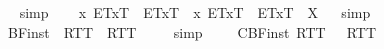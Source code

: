 \begin{isabellebody}
\isadelimproof
\ %
\endisadelimproof
%
\isatagproof
{}\isamarkupfalse%
\ simp\ \isamarkupfalse%
%
\endisatagproof
{\isafoldproof}%
%
\isadelimproof
%
\endisadelimproof
\isanewline
\ \isamarkupfalse%
\ {\isachardoublequoteopen}\isactrlbold {\isasymdiamond}{\isacharparenleft}\isactrlbold {\isasymexists}x{\isachardot}\ {\isasymlparr}E\isactrlsup T{\isacharcomma}x\isactrlsup T{\isasymrparr}\ \isactrlbold {\isasymand}\ \isactrlbold {\isasymdiamond}{\isacharparenleft}\isactrlbold {\isasymnot}{\isasymlparr}E\isactrlsup T{\isacharcomma}x\isactrlsup T{\isasymrparr}{\isacharparenright}{\isacharparenright}\ \isactrlbold {\isasymand}\ \isactrlbold {\isasymdiamond}{\isacharparenleft}\isactrlbold {\isasymnot}{\isacharparenleft}\isactrlbold {\isasymexists}x{\isachardot}\ {\isasymlparr}E\isactrlsup T{\isacharcomma}x\isactrlsup T{\isasymrparr}\ \isactrlbold {\isasymand}\ \isactrlbold {\isasymdiamond}{\isacharparenleft}\isactrlbold {\isasymnot}{\isasymlparr}E\isactrlsup T{\isacharcomma}x\isactrlsup T{\isasymrparr}{\isacharparenright}{\isacharparenright}{\isacharparenright}\ {\isacharequal}\ X{\isachardoublequoteclose}%
\isadelimproof
\ %
\endisadelimproof
%
\isatagproof
{}\isamarkupfalse%
\ simp\ \isamarkupfalse%
\ %
%
\endisatagproof
{\isafoldproof}%
%
\isadelimproof
%
\endisadelimproof
%
\isamarkuptrue%
\ \isamarkupfalse%
\ BF{\isacharunderscore}inst{\isacharcolon}\ {\isachardoublequoteopen}{\isacharbrackleft}{\isacharparenleft}\isactrlbold {\isasymforall}{\isasymalpha}{\isachardot}\ \isactrlbold {\isasymbox}{\isasymlparr}R\isactrlsup T{\isacharcomma}{\isasymalpha}\isactrlsup T{\isasymrparr}{\isacharparenright}\ \isactrlbold {\isasymrightarrow}\ \isactrlbold {\isasymbox}{\isacharparenleft}\isactrlbold {\isasymforall}{\isasymalpha}{\isachardot}{\isasymlparr}R\isactrlsup T{\isacharcomma}{\isasymalpha}\isactrlsup T{\isasymrparr}{\isacharparenright}{\isacharbrackright}\ {\isacharequal}\ {\isasymtop}{\isachardoublequoteclose}%
\isadelimproof
\ %
\endisadelimproof
%
\isatagproof
{}\isamarkupfalse%
\ simp%
\endisatagproof
{\isafoldproof}%
%
\isadelimproof
%
\endisadelimproof
\ \isanewline
\ \isamarkupfalse%
\ CBF{\isacharunderscore}inst{\isacharcolon}\ {\isachardoublequoteopen}{\isacharbrackleft}\isactrlbold {\isasymbox}{\isacharparenleft}\isactrlbold {\isasymforall}{\isasymalpha}{\isachardot}{\isasymlparr}R\isactrlsup T{\isacharcomma}{\isasymalpha}\isactrlsup T{\isasymrparr}{\isacharparenright}\ \isactrlbold {\isasymrightarrow}\ {\isacharparenleft}\isactrlbold {\isasymforall}{\isasymalpha}{\isachardot}\ \isactrlbold {\isasymbox}{\isasymlparr}R\isactrlsup T{\isacharcomma}{\isasymalpha}\isactrlsup T{\isasymrparr}{\isacharparenright}{\isacharbrackright}\ {\isacharequal}\ {\isasymtop}{\isachardoublequoteclose}%

\end{isabellebody}
